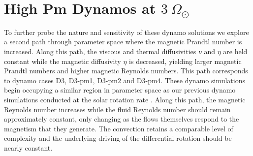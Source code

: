 \section{High Pm Dynamos at $3~\Omega_\odot$}

To further probe the nature and sensitivity of these dynamo solutions we
explore a second path through parameter space where the magnetic
Prandtl number is increased.  Along this path, the viscous and thermal
diffusivities $\nu$ and $\eta$ are held constant while the magnetic
diffusivity $\eta$ is decreased, yielding larger magnetic Prandtl 
numbers and higher magnetic Reynolds numbers.  This path corresponds to
dynamo cases D3, D3-pm1, D3-pm2 and D3-pm4.  These dynamo simulations
begin occupying a similar region in parameter space as our previous
dynamo simulations conducted at the solar rotation rate
\citep[e.g.,][]{Brun_et_al_2004,Browning_et_al_2006}.  Along this
path, the magnetic Reynolds number increases while the fluid Reynolds
number should remain approximately constant, only changing as the
flows themselves respond to the magnetism that they generate.  
The convection retains a comparable level of complexity and the
underlying driving of the differential rotation should be nearly constant.

